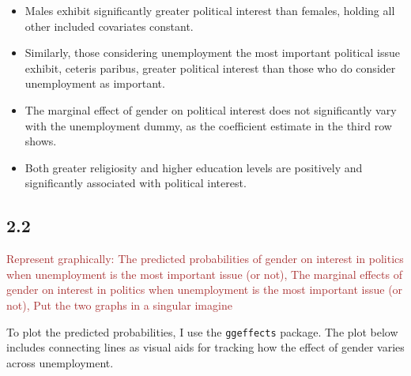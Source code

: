 \documentclass[
]{article}
\begin{document}
\begin{itemize}
\item
  Males exhibit significantly greater political interest than females,
  holding all other included covariates constant.
\item
  Similarly, those considering unemployment the most important political
  issue exhibit, ceteris paribus, greater political interest than those
  who do consider unemployment as important.
\item
  The marginal effect of gender on political interest does not
  significantly vary with the unemployment dummy, as the coefficient
  estimate in the third row shows.
\item
  Both greater religiosity and higher education levels are positively
  and significantly associated with political interest.
\end{itemize}

\hypertarget{section-4}{%
\subsection{2.2}\label{section-4}}

\textcolor{brown}{Represent graphically: The predicted probabilities of gender on interest in politics when unemployment is the most important issue (or not), The marginal effects of gender on interest in politics when unemployment is the most important issue (or not), Put the two graphs in a singular imagine}

To plot the predicted probabilities, I use the \texttt{ggeffects}
package. The plot below includes connecting lines as visual aids for
tracking how the effect of gender varies across unemployment.
\end{document}
